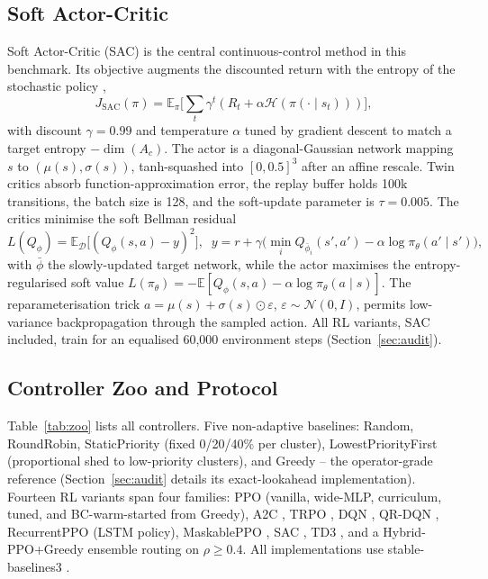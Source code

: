 \documentclass[9pt,conference]{IEEEtran}
\begin{document}
\subsection{Soft Actor-Critic}
Soft Actor-Critic (SAC) is the central continuous-control method in this benchmark. Its objective augments the discounted return with the entropy of the stochastic policy \cite{haarnoja2018},
\begin{equation}
J_{\mathrm{SAC}}(\pi)=\mathbb{E}_\pi\Big[\textstyle\sum_t\gamma^t(R_t+\alpha\mathcal{H}(\pi(\cdot\mid s_t)))\Big],
\label{eq:sac}
\end{equation}
with discount $\gamma=0.99$ and temperature $\alpha$ tuned by gradient descent to match a target entropy $-\dim(A_c)$. The actor is a diagonal-Gaussian network mapping $s$ to $(\mu(s),\sigma(s))$, tanh-squashed into $[0,0.5]^3$ after an affine rescale. Twin critics absorb function-approximation error, the replay buffer holds 100k transitions, the batch size is 128, and the soft-update parameter is $\tau=0.005$. The critics minimise the soft Bellman residual
\begin{equation}
L(Q_\phi)=\mathbb{E}_{\mathcal{D}}\big[(Q_\phi(s,a)-y)^2\big],\;\; y=r+\gamma\big(\min_iQ_{\bar\phi_i}(s',a')-\alpha\log\pi_\theta(a'\mid s')\big),
\label{eq:bellman}
\end{equation}
with $\bar\phi$ the slowly-updated target network, while the actor maximises the entropy-regularised soft value $L(\pi_\theta)=-\mathbb{E}[Q_\phi(s,a)-\alpha\log\pi_\theta(a\mid s)]$. The reparameterisation trick $a=\mu(s)+\sigma(s)\odot\varepsilon$, $\varepsilon\sim\mathcal{N}(0,I)$, permits low-variance backpropagation through the sampled action. All RL variants, SAC included, train for an equalised 60{,}000 environment steps (Section~\ref{sec:audit}).

\subsection{Controller Zoo and Protocol}
Table~\ref{tab:zoo} lists all controllers. Five non-adaptive baselines: Random, RoundRobin, StaticPriority (fixed 0/20/40\% per cluster), LowestPriorityFirst (proportional shed to low-priority clusters), and Greedy -- the operator-grade reference (Section~\ref{sec:audit} details its exact-lookahead implementation). Fourteen RL variants span four families: PPO \cite{schulman2017} (vanilla, wide-MLP, curriculum, tuned, and BC-warm-started from Greedy), A2C \cite{mnih2016}, TRPO \cite{schulman2015}, DQN \cite{mnih2015}, QR-DQN \cite{dabney2018}, RecurrentPPO (LSTM policy), MaskablePPO \cite{huang2022}, SAC \cite{haarnoja2018}, TD3 \cite{fujimoto2018}, and a Hybrid-PPO+Greedy ensemble routing on $\rho\ge0.4$. All implementations use stable-baselines3 \cite{raffin2021}.
\end{document}
